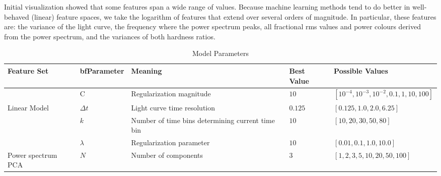 \documentclass[12pt]{emulateapj}
\begin{document}
Initial visualization showed that some features span a wide range of values. Because machine learning methods tend to do better in well-behaved (linear) feature spaces, we take the logarithm of features that extend over several orders of magnitude. In particular, these features are: the variance of the light curve, the frequency where the power spectrum peaks, all fractional rms values and power colours derived from the power spectrum, and the variances of both hardness ratios. 
\begin{table}[hbtp]
\renewcommand{\arraystretch}{1.3}
\footnotesize
\caption{Model Parameters}
\begin{threeparttable} 
\begin{tabularx}{\textwidth}{p{2.0cm}p{2.0cm}p{5.0cm}p{1.0cm}p{6.0cm}}%
\toprule
\bf{Feature Set} & bf{Parameter} & \bf{Meaning} & Best Value &  \bf{Possible Values} \\ \midrule
		& C & Regularization magnitude & $10$ & $[10^{-4}, 10^{-3}, 10^{-2}, 0.1, 1, 10, 100]$ \\ \midrule
 Linear Model & $\Delta t$ & Light curve time resolution & $0.125$ & $[0.125, 1.0, 2.0, 6.25]$ \\
		& $k$ & Number of time bins determining current time bin & $10$ & $[10, 20, 30, 50, 80]$ \\
		& $\lambda$ & Regularization parameter & $10$ & $[0.01, 0.1, 1.0, 10.0]$ \\ \midrule
Power spectrum PCA & $N$ & Number of components & $3$ & $[1,2,3,5,10,20,50,100]$ \\

 \bottomrule
\end{tabularx}
   \begin{tablenotes}
      \item{}
\end{tablenotes}
\end{threeparttable}
\label{tab:parameters}
\end{table}
\end{document}

